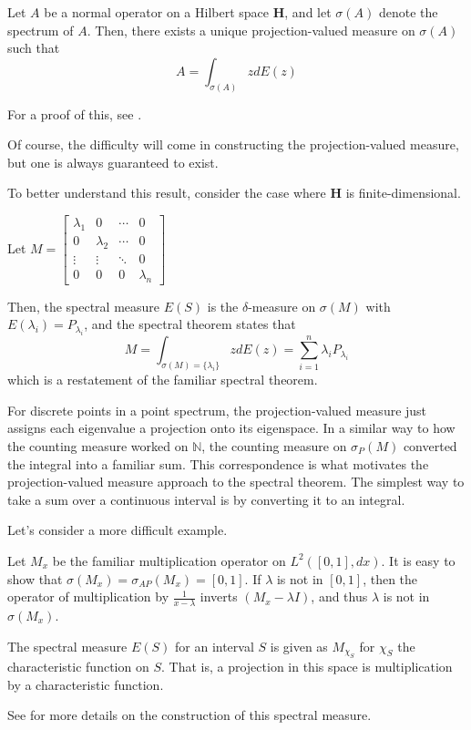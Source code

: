 \begin{theorem}
    Let $A$ be a normal operator on a Hilbert space $\textbf{H}$, and let
    $\sigma(A)$ denote the spectrum of $A$. Then, there exists a unique
    projection-valued measure on $\sigma(A)$ such that
    \[
        A = \int_{\sigma(A)}zdE(z)
        \]
\end{theorem}
For a proof of this, see \cite[Ch. 6]{MacCluer2009}.

Of course, the difficulty will come in constructing the projection-valued
measure, but one is always guaranteed to exist.

To better understand this
result, consider the case where $\textbf{H}$ is finite-dimensional.
    \begin{example}
        Let $M = 
            \begin{bmatrix}
                \lambda_1 & 0 & \cdots & 0 \\
                0 & \lambda_2 & \cdots & 0 \\
                \vdots & \vdots & \ddots & 0\\
                0 & 0 & 0 & \lambda_n 
            \end{bmatrix}$

            Then, the spectral measure $E(S)$ is the $\delta$-measure on
            $\sigma(M)$ with $E(\lambda_i) = P_{\lambda_i}$, and the spectral
            theorem states that
            \[
                M = \int_{\sigma(M) = \{\lambda_i\}} zdE(z)
                  = \sum_{i=1}^n \lambda_i P_{\lambda_i}
                  \]
            which is a restatement of the familiar spectral theorem.
    \end{example}
For discrete points in a point spectrum, the projection-valued measure just
assigns each eigenvalue a projection onto its eigenspace. In a similar way to
how the counting measure worked on $\mathbb{N}$, the counting measure on
$\sigma_P(M)$ converted the integral into a familiar sum. This correspondence is
what motivates the projection-valued measure approach to the spectral theorem.
The simplest way to take a sum over a continuous interval is by converting it to
an integral.

Let's consider a more difficult example.

    \begin{example}
        Let $M_x$ be the familiar multiplication operator on $L^2([0,1],dx)$.
        It is easy to show that $\sigma(M_x) = \sigma_{AP}(M_x) = [0,1]$. If
        $\lambda$ is not in $[0,1]$, then the operator of multiplication by
        $\frac{1}{x-\lambda}$ inverts $(M_x-\lambda I)$, and thus $\lambda$ is
        not in $\sigma(M_x)$.

        The spectral measure $E(S)$ for an interval $S$ is given as $M_{\chi_S}$
        for $\chi_S$ the characteristic function on $S$. That is, a projection
        in this space is multiplication by a characteristic function.

        See \cite[Ex. 6.11]{MacCluer2009} for more details on the construction of this
        spectral measure.
    \end{example}
